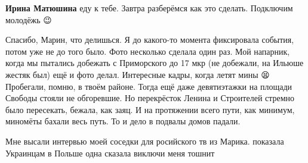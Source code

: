\begin{itemize} %
\textbf{Ирина Матюшина} еду к тебе. Завтра разберёмся как это сделать. Подключим молодёжь 😉
\end{itemize} %


Спасибо, Марин, что делишься. Я до какого-то момента фиксировала события, потом
уже не до того было. Фото несколько сделала один раз. Мой напарник, когда мы
пытались добежать с Приморского до 17 мкр (не добежали, на Ильюше жестяк был) ещё
и фото делал. Интересные кадры, когда летят мины 😫 Пробегали, помню, в твоём
районе. Тогда ещё даже девятиэтажки на площади Свободы стояли не обгоревшие. Но
перекрёсток Ленина и Строителей стремно было пересекать, бежала, как заяц. И на
протяжении всего пути, как минимум, миномёты бахали весь путь. То и дело в
подвалы домов падали.


Мне высали интервью моей соседки для росийского тв из Марика. показала
Украинцам в Польше одна сказала виключи меня тошнит
